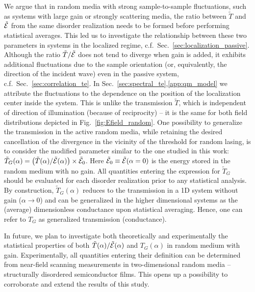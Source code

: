 We argue that in random media with strong sample-to-sample fluctuations, such as systems with large gain or strongly scattering media, the ratio between $\tilde{T}$ and $\tilde{\cal E}$ from the same disorder realization needs to be formed before performing statistical averages. This led us to investigate the relationship between these two parameters in systems in the localized regime, c.f.~Sec.~\ref{sec:localization_passive}. Although the ratio $\tilde{T}/\tilde{\cal E}$ does not tend to diverge when gain is added, it exhibits additional fluctuations due to the sample orientation (or, equivalently, the direction of the incident wave) even in the passive system, c.f.~Sec.~\ref{sec:correlation_te}. In Sec.~\ref{sec:spectral_te},\ref{app:qm_model} we attribute the fluctuations to the dependence on the position of the localization center inside the system. This is unlike the transmission $\tilde{T}$, which is independent of direction of illumination (because of reciprocity) -- it is the same for both field distributions depicted in Fig.~\ref{fig:Efield_random}. One possibility to generalize the transmission in the active random media, while retaining the desired cancellation  of the divergence in the vicinity of the threshold for random lasing, is to consider the modified parameter similar to the one studied in this work: $\tilde{T}_G(\alpha)=\left(\tilde{T}(\alpha)/\tilde{\cal E}(\alpha)\right)\times\tilde{\cal E}_0$. Here $\tilde{\cal E}_0\equiv\tilde{\cal E}(\alpha=0)$ is the energy stored in the random medium with no gain. All quantities entering the expression for $\tilde{T}_G$ should be evaluated for each disorder realization prior to any statistical analysis. By construction, $\tilde{T}_G(\alpha)$ reduces to the transmission in a 1D system without gain ($\alpha\rightarrow 0$) and can be generalized in the higher dimensional systems as the (average) dimensionless conductance upon statistical averaging. Hence, one can refer to $T_G$ as generalized transmission (conductance).

In future, we plan to investigate both theoretically and experimentally the statistical properties of both $\tilde{T}(\alpha)/\tilde{{\cal E}}(\alpha)$ and $T_G(\alpha)$ in random medium with gain. Experimentally, all quantities entering their definition can be determined from near-field scanning measurements in two-dimensional random media -- structurally disordered semiconductor films. This opens up a possibility to corroborate and extend the results of this study. 

